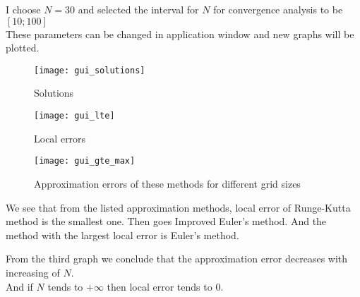 \documentclass[12pt, a4paper]{article}
\begin{document}
I choose $N = 30$ and selected the interval for $N$ for convergence analysis to be $[10; 100]$ \\
These parameters can be changed in application window and new graphs will be plotted. 

\begin{figure}[H]
        \centering
        \texttt{[image: gui\_solutions]}
        \caption{Solutions}
        \label{fig:my_label}
    \end{figure}
    
    \begin{figure}[H]
        \centering
        \texttt{[image: gui\_lte]}
        \caption{Local errors}
        \label{fig:my_label}
    \end{figure}
    
    \begin{figure}[H]
        \centering
        \texttt{[image: gui\_gte\_max]}
        \caption{Approximation errors of these methods for different grid sizes}
        \label{fig:my_label}
    \end{figure}

\begin{center}
We see that from the listed approximation methods, local error of Runge-Kutta method is the smallest one. Then goes Improved Euler's method. And the method with the largest local error is Euler's method. 

From the third graph we conclude that the approximation error decreases with increasing of $N$. \\
And if $N$ tends to $+\infty$ then local error tends to 0.
\end{center}
\end{document}
